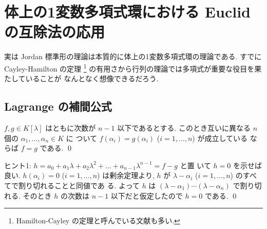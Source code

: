 \documentclass[12pt,twoside]{jarticle}
\begin{document}

\section{体上の1変数多項式環における Euclid の互除法の応用}
\label{sec:Euclidean-algorithm-K[x]}

実は Jordan 標準形の理論は本質的に体上の1変数多項式環の理論である.
すでに Cayley-Hamilton の定理%
\footnote{Hamilton-Cayley の定理と呼んでいる文献も多い.}
の有用さから行列の理論では多項式が重要な役目を果たしていることが
なんとなく想像できるだろう. 


\subsection{Lagrange の補間公式}
\label{sec:Lagrange-interpolation}


\begin{question}
\label{q:Lagrange-interpolation-0}
  $f,g\in K[\lambda]$ はともに次数が $n-1$ 以下であるとする.
  このとき互いに異なる $n$ 個の $\alpha_1,\dots,\alpha_n\in K$ に
  ついて $f(\alpha_i)=g(\alpha_i)$ ($i=1,\dots,n$) が成立している
  ならば $f=g$ である. 
  \qed
\end{question}

\noindent
ヒント1: $h=a_0+a_1\lambda+a_2\lambda^2+\dots+a_{n-1}\lambda^{n-1}=f-g$ と置
いて $h=0$ を示せば良い.  $h(\alpha_i)=0$ ($i=1,\dots,n$) は剰余定理より, 
$h$ が $\lambda-\alpha_i$ ($i=1,\dots,n$) のすべてで割り切れることと同値であ
る.  よって $h$ は $(\lambda-\alpha_1)\cdots(\lambda-\alpha_n)$ で割り切れる.
そのとき $h$ の次数は $n-1$ 以下だと仮定したので $h=0$ である.
\qed
\end{document}
